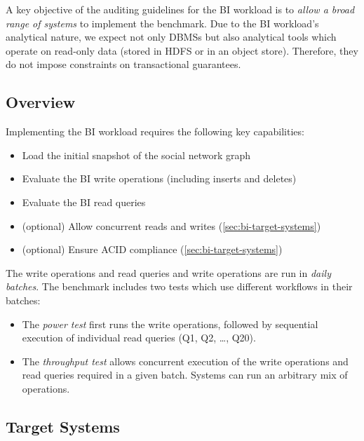 A key objective of the auditing guidelines for the BI workload is to \emph{allow a broad range of systems} to implement the benchmark.
Due to the BI workload's analytical nature, we expect not only DBMSs but also analytical tools which operate on read-only data (stored \eg in HDFS or in an object store).
Therefore, they do not impose constraints on transactional guarantees.

\subsection{Overview}
\label{sec:bi-audit-overview}

Implementing the BI workload requires the following key capabilities:

\begin{itemize}
    \item Load the initial snapshot of the social network graph
    \item Evaluate the BI write operations (including inserts and deletes)
    \item Evaluate the BI read queries
    \item (optional) Allow concurrent reads and writes (\autoref{sec:bi-target-systems})
    \item (optional) Ensure ACID compliance (\autoref{sec:bi-target-systems})
\end{itemize}

The write operations and read queries and write operations are run in \emph{daily batches}.
The benchmark includes two tests which use different workflows in their batches:

\begin{itemize}
    \item The \emph{power test} first runs the write operations, followed by sequential execution of individual read queries (Q1, Q2, \ldots, Q20).
    \item The \emph{throughput test} allows concurrent execution of the write operations and read queries required in a given batch.
    Systems can run an arbitrary mix of operations.
\end{itemize}

\subsection{Target Systems}
\label{sec:bi-target-systems}

